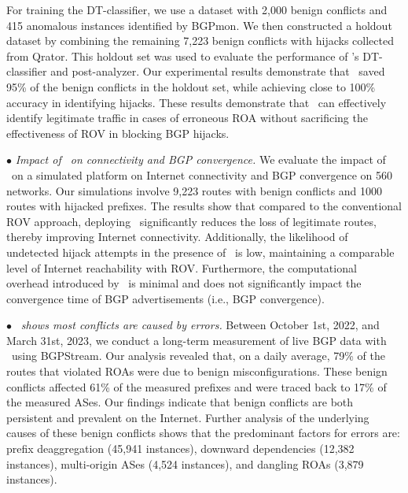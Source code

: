{For training the DT-classifier, we use a dataset with 2,000 benign conflicts and 415 anomalous instances identified by BGPmon. We then constructed a holdout dataset by combining the remaining 7,223 benign conflicts with hijacks collected from Qrator. This holdout set was used to evaluate the performance of \lov's DT-classifier and post-analyzer. Our experimental results demonstrate that \lov\ saved 95\% of the benign conflicts in the holdout set, while achieving close to 100\% accuracy in identifying hijacks. These results demonstrate that \lov\ can effectively identify legitimate traffic in cases of erroneous ROA without sacrificing the effectiveness of ROV in blocking BGP hijacks.

$\bullet$ {\em Impact of \lov\ on connectivity and BGP convergence.} We evaluate the impact of \lov\ on a simulated platform on Internet connectivity and BGP convergence on 560 networks. Our simulations involve 9,223 routes with benign conflicts and 1000 routes with hijacked prefixes. The results show that compared to the conventional ROV approach, deploying \lov\ significantly reduces the loss of legitimate routes, thereby improving Internet connectivity. Additionally, the likelihood of undetected hijack attempts in the presence of \lov\ is low, maintaining a comparable level of Internet reachability with ROV. Furthermore, the computational overhead introduced by \lov\ is minimal and does not significantly impact the convergence time of BGP advertisements (i.e., BGP convergence).

 $\bullet$ {\em \lov\ shows most conflicts are caused by errors.} Between October 1st, 2022, and March 31st, 2023, we conduct a long-term measurement of live BGP data with \lov\ using BGPStream. Our analysis revealed that, on a daily average, 79\% of the routes that violated ROAs were due to benign misconfigurations. These benign conflicts affected 61\% of the measured prefixes and were traced back to 17\% of the measured ASes. Our findings indicate that benign conflicts are both persistent and prevalent on the Internet. Further analysis of the underlying causes of these benign conflicts shows that the predominant factors for errors are: prefix deaggregation (45,941 instances), downward dependencies (12,382 instances), multi-origin ASes (4,524 instances), and dangling ROAs (3,879 instances). 
 

}
